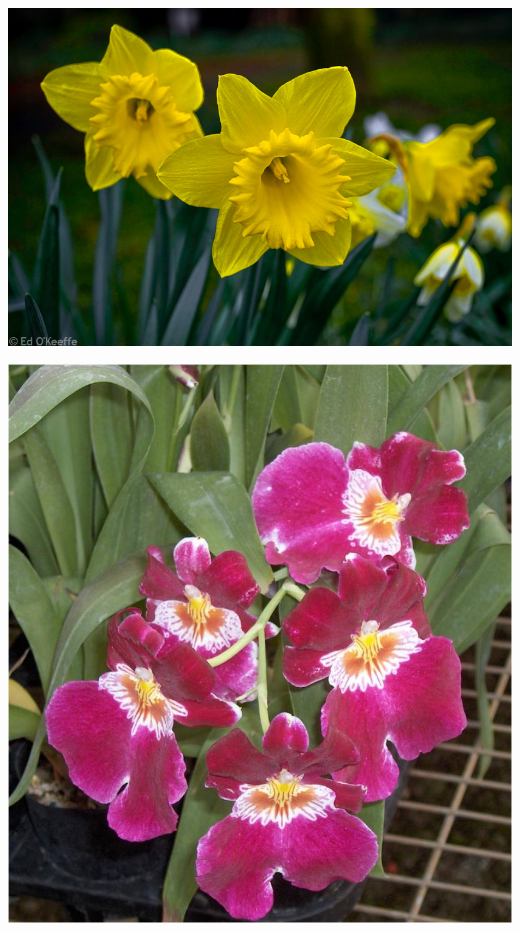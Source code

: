 \documentclass{article}
\begin{document}
\begin{center}
\includegraphics[width=0.9\textheight, angle=90]{../Narcissus_(Daffodil).jpg}
\end{center}
\newpage

\begin{center}
\includegraphics[width=0.9\textheight, angle=90]{../Orchid_Miltonia.jpg}
\end{center}
\newpage
\end{document}
